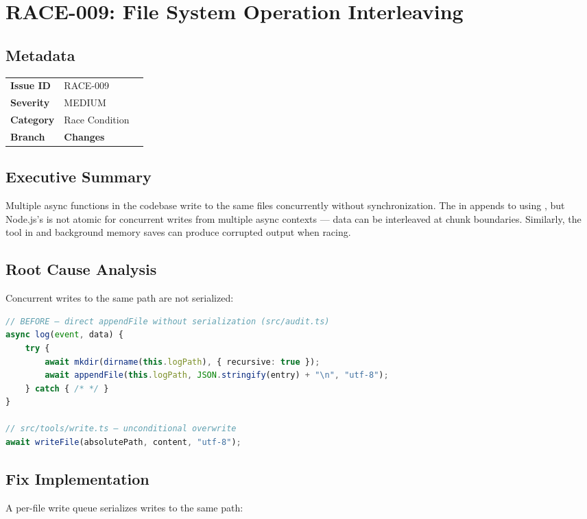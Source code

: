 \section{RACE-009: File System Operation Interleaving}
\label{sec:race-009}
\subsection*{Metadata}
\begin{tabular}{ll}
\textbf{Issue ID} & RACE-009 \\
\textbf{Severity} & MEDIUM \\
\textbf{Category} & Race Condition \\
\textbf{Branch} & 
\textbf{Changes} &  \\
\end{tabular}

\subsection*{Executive Summary}
Multiple async functions in the codebase write to the same files concurrently without synchronization. The  in  appends to  using , but Node.js's  is not atomic for concurrent writes from multiple async contexts — data can be interleaved at chunk boundaries. Similarly, the  tool in  and background memory saves can produce corrupted output when racing.

\subsection*{Root Cause Analysis}
Concurrent writes to the same path are not serialized:

\begin{lstlisting}[language=TypeScript]
// BEFORE — direct appendFile without serialization (src/audit.ts)
async log(event, data) {
    try {
        await mkdir(dirname(this.logPath), { recursive: true });
        await appendFile(this.logPath, JSON.stringify(entry) + "\n", "utf-8");
    } catch { /* */ }
}

// src/tools/write.ts — unconditional overwrite
await writeFile(absolutePath, content, "utf-8");
\end{lstlisting}

\subsection*{Fix Implementation}
A per-file write queue serializes writes to the same path:


